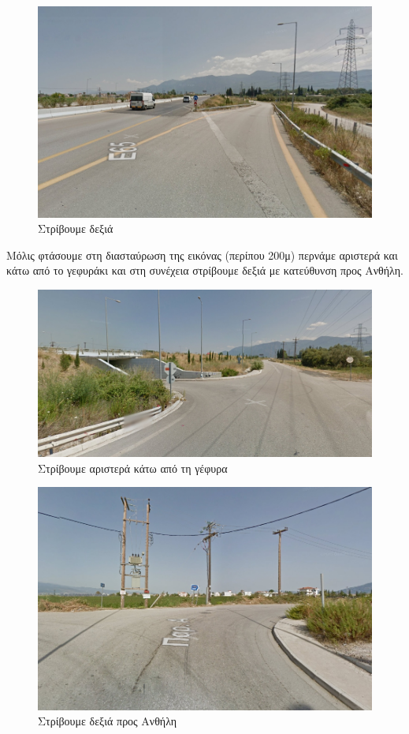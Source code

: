 \begin{figure}[H]
\includegraphics[width=\textwidth]{images/lamia-athina/lamia/lamia_002.jpg} 
\caption{Στρίβουμε δεξιά} 
\end{figure}

Μόλις φτάσουμε στη διασταύρωση της εικόνας (περίπου 200μ) περνάμε αριστερά και κάτω από το γεφυράκι και στη συνέχεια στρίβουμε δεξιά με κατεύθυνση προς Ανθήλη. 
\begin{figure}[H]
\includegraphics[width=\textwidth]{images/lamia-athina/lamia/lamia_003.jpg}
\caption{Στρίβουμε αριστερά κάτω από τη γέφυρα}
\end{figure}
\begin{figure}[H]  
\includegraphics[width=\textwidth]{images/lamia-athina/lamia/lamia_004.jpg} 
\caption{Στρίβουμε δεξιά προς Ανθήλη} 
\end{figure}


